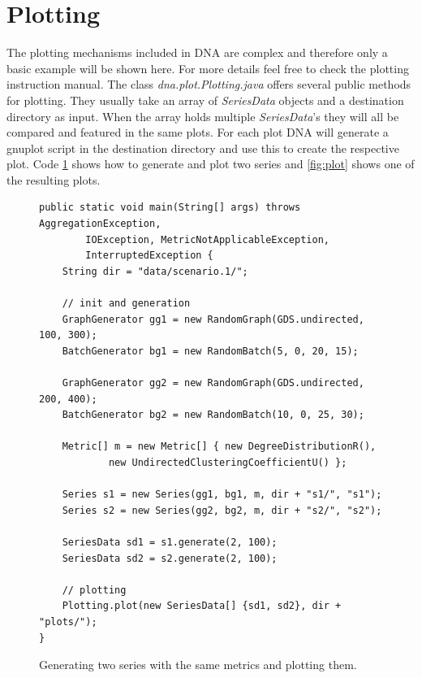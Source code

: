\section{Plotting}
The plotting mechanisms included in DNA are complex and therefore only a basic example will be shown here. For more details feel free to check the plotting instruction manual. The class \textit{dna.plot.Plotting.java} offers several public methods for plotting. They usually take an array of \textit{SeriesData} objects and a destination directory as input. When the array holds multiple \textit{SeriesData}'s they will all be compared and featured in the same plots. For each plot DNA will generate a gnuplot script in the destination directory and use this to create the respective plot. Code \ref{code:plot-example} shows how to generate and plot two series and \ref{fig:plot} shows one of the resulting plots.
\begin{figure} [h]
\begin{lstlisting}
public static void main(String[] args) throws AggregationException,
		IOException, MetricNotApplicableException,
		InterruptedException {
	String dir = "data/scenario.1/";
	
	// init and generation
	GraphGenerator gg1 = new RandomGraph(GDS.undirected, 100, 300);
	BatchGenerator bg1 = new RandomBatch(5, 0, 20, 15);
	
	GraphGenerator gg2 = new RandomGraph(GDS.undirected, 200, 400);
	BatchGenerator bg2 = new RandomBatch(10, 0, 25, 30);

	Metric[] m = new Metric[] { new DegreeDistributionR(),
			new UndirectedClusteringCoefficientU() };

	Series s1 = new Series(gg1, bg1, m, dir + "s1/", "s1");
	Series s2 = new Series(gg2, bg2, m, dir + "s2/", "s2");
	
	SeriesData sd1 = s1.generate(2, 100);
	SeriesData sd2 = s2.generate(2, 100);

	// plotting
	Plotting.plot(new SeriesData[] {sd1, sd2}, dir + "plots/");
}
\end{lstlisting}
\caption{Generating two series with the same metrics and plotting them.}
\label{code:plot-example}
\end{figure}


